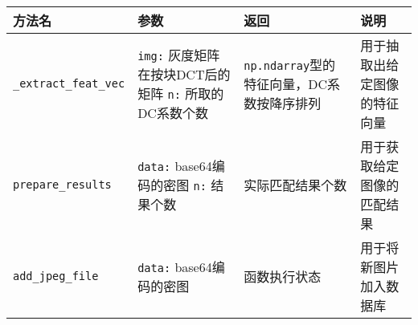 \begin{table}[H]
  \centering
  \begin{tabular}[H]{| l | p{3.5cm} | p{3cm} | p{3cm} |}
    \hline
    方法名 & 参数 & 返回 & 说明 \\
    \hline
    \texttt{\_extract\_feat\_vec}
  & \texttt{img:} 灰度矩阵在按块DCT后的矩阵\newline
    \texttt{n:} 所取的DC系数个数
  & \texttt{np.ndarray}型的特征向量，DC系数按降序排列
  & 用于抽取出给定图像的特征向量 \\
    \hline
    \texttt{prepare\_results}
  & \texttt{data:} base64编码的密图\newline
    \texttt{n:} 结果个数
  & 实际匹配结果个数
  & 用于获取给定图像的匹配结果 \\
    \hline
    \texttt{add\_jpeg\_file}
  & \texttt{data:} base64编码的密图
  & 函数执行状态 & 用于将新图片加入数据库 \\
    \hline
  \end{tabular}
  \label{tab:server-core}
\end{table}

